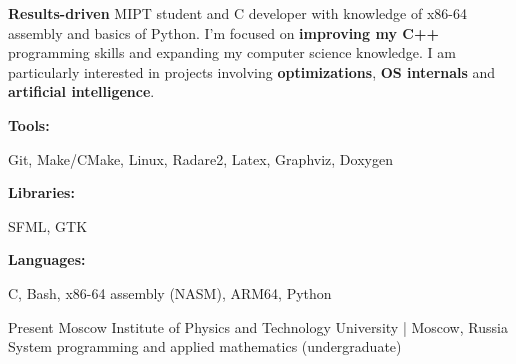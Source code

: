 \documentclass[10pt]{developercv}
\begin{document}
\raisebox{-5.8cm}
{
\begin{minipage}[t]{0.305\textwidth}
\end{minipage}
}
\begin{minipage}[t]{0.68\textwidth}
	\vspace{-6pt}
 
    \textbf{Results-driven} MIPT student and C developer with knowledge of x86-64 assembly and basics of Python. I'm focused on \textbf{improving my C++} programming skills and expanding my computer science knowledge. I am particularly interested in projects involving \textbf{optimizations}, \textbf{OS internals} and \textbf{artificial intelligence}.
    
    \vspace{-6pt}
    \vspace{-6pt}

    \begin{minipage}[t]{0.2\textwidth}
    \textbf{Tools:}
    \end{minipage}
    \hfill
    \begin{minipage}[t]{0.73\textwidth}
        Git, Make/CMake, Linux, Radare2, Latex, Graphviz, Doxygen
    \end{minipage}
    \vspace{2mm}
    
    \begin{minipage}[t]{0.2\textwidth}
        \textbf{Libraries:}
    \end{minipage}
    \hfill
    \begin{minipage}[t]{0.73\textwidth}
        SFML, GTK
    \end{minipage}
    \vspace{2mm}
    
    \begin{minipage}[t]{0.2\textwidth}
        \textbf{Languages:}
    \end{minipage}
    \hfill
    \begin{minipage}[t]{0.73\textwidth}
        C, Bash, x86-64 assembly (NASM), ARM64, Python
    \end{minipage}
    
\end{minipage}
\vspace{2mm}

\vspace{-10 pt}
\vspace{-5 pt}        
\begin{entrylist}
    \entry
		{Present}
		{Moscow Institute of Physics and Technology}
		{University | Moscow, Russia}
		{System programming and applied mathematics (undergraduate)}
\end{entrylist}
\end{document}
